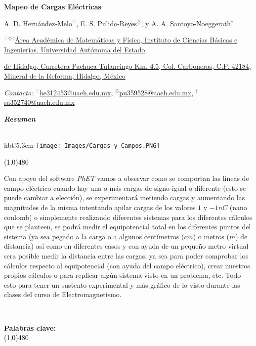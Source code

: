 \documentclass[a4paper,10pt]{article}
\makeatletter
\newcounter{resumen}
\newenvironment{resumen}
{	\begin{center}
	\begin{minipage}[t!]{480 pt}
	\vspace{2mm}
	\emph{\textcolor{MiColor1}{\textbf{Resumen}}}
	\\[-1mm]
	\\[-10mm]
	\hfill 
	   \begin{wrapfigure}{hbt!}{5.3cm}
       \centering
       \texttt{[image: Images/Cargas y Campos.PNG]}
       \end{wrapfigure} \vspace{-4mm}
    \hfill
	\textcolor{Black}{\line(1,0){480}}\\ \par
}
{
	\par \normalsize \par
	\par \\[3mm] \par
	\vspace{4mm}
	\par \footnotesize\textbf{Palabras clave: \footnotesize\@palabras}
	\\[-1mm]
	\textcolor{Black}{\line(1,0){480}}\\ \par
	\\[5cm]
	\end{minipage}
	\vspace{0.5cm}
	\end{center}
}
\makeatother
\begin{document}
{\textbf{\LARGE Mapeo de Cargas Eléctricas} \par} \vspace{3mm}
{\small A. D. Hernández-Melo\textcolor{Plum}{$^\heartsuit$}, E. S. Pulido-Reyes\textcolor{ProcessBlue}{$^\diamondsuit$}, y A. A. Santoyo-Noeggerath\textcolor{Green}{$^\dagger$} \par} \vspace{3mm}
{\footnotesize \textcolor{Plum}{$^\heartsuit$}\textcolor{ProcessBlue}{$^\diamondsuit$}\textcolor{Green}{$^\dagger$}\protect\href{https://www.google.com/maps/place/\%C3\%81rea+Acad\%C3\%A9mica+de+Matem\%C3\%A1ticas+y+F\%C3\%ADsica,+Universidad+Aut\%C3\%B3noma+del+Estado+de+Hidalgo,+Universidad+Autonoma+del+Estado+de+Hidalgo/@20.0934375,-98.7104375,17z/data=!4m13!1m7!3m6!1s0x0:0x0!2s76G337VQ\%2B9R!3b1!8m2!3d20.0934375!4d-98.7104375!3m4!1s0x85d1a773691bc455:0xe552799fa3ca76a5!8m2!3d20.0933901!4d-98.7104677}{Área Académica de Matemáticas y Física, Instituto de Ciencias Básicas e Ingenierías, Universidad Autónoma del Estado} \par} 
{\footnotesize \protect\href{https://www.google.com/maps/place/\%C3\%81rea+Acad\%C3\%A9mica+de+Matem\%C3\%A1ticas+y+F\%C3\%ADsica,+Universidad+Aut\%C3\%B3noma+del+Estado+de+Hidalgo,+Universidad+Autonoma+del+Estado+de+Hidalgo/@20.0934375,-98.7104375,17z/data=!4m13!1m7!3m6!1s0x0:0x0!2s76G337VQ\%2B9R!3b1!8m2!3d20.0934375!4d-98.7104375!3m4!1s0x85d1a773691bc455:0xe552799fa3ca76a5!8m2!3d20.0933901!4d-98.7104677}{de Hidalgo, Carretera Pachuca-Tulancingo Km. 4.5, Col. Carboneras, C.P. 42184, Mineral de la Reforma, Hidalgo, México} \par}
{\footnotesize \textit{Contacto}: \textcolor{Plum}{$^\heartsuit$}\protect\href{mailto:he312453@uaeh.edu.mx}{he312453@uaeh.edu.mx},  \textcolor{ProcessBlue}{$^\diamondsuit$}\protect\href{mailto:pu359528@uaeh.edu.mx}{pu359528@uaeh.edu.mx}, \textcolor{Green}{$^\dagger$}\protect\href{mailto:sa352740@uaeh.edu.mx}{sa352740@uaeh.edu.mx}}

\begin{resumen}
Con apoyo del software \textit{PhET} vamos a observar como se comportan las lineas de campo eléctrico cuando hay una o más cargas de signo igual o diferente (esto se puede cambiar a elección), se experimentará metiendo cargas y aumentando las magnitudes de la misma intentando apilar cargas de los valores $1$ y $-1 nC$ (nano coulomb) o simplemente realizando diferentes sistemas para los diferentes cálculos que se planteen, se podrá medir el equipotencial total en los diferentes puntos del sistema (ya sea pegado a la carga o a algunos centímetros ($cm$) o metros ($m$)  de distancia) así como en diferentes casos  y con ayuda de un pequeño metro virtual sera posible medir la distancia entre las cargas, ya sea para poder comprobar los cálculos respecto al equipotencial (con ayuda del campo eléctrico), crear nuestros propios cálculos o para replicar algún sistema visto en un problema, etc. Todo esto para tener un sustento experimental y más gráfico de lo visto durante las clases del curso de Electromagnetismo.
\end{resumen}
\end{document}
